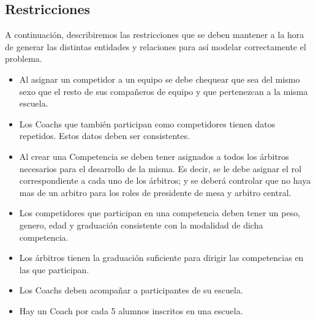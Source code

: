 \subsection{Restricciones}


A continuación, describiremos las restricciones que se deben mantener a la hora de generar las distintas entidades y relaciones para así modelar correctamente el problema.

\begin{itemize}
\item Al asignar un competidor a un equipo se debe chequear que sea del mismo sexo que el resto de sus compañeros de equipo y que pertenezcan a la misma escuela.
\item Los Coachs que también participan como competidores tienen datos repetidos. Estos datos deben ser consistentes.
\item Al crear una Competencia se deben tener asignados a todos los árbitros necesarios para el desarrollo de la misma. Es decir, se le debe asignar el rol correspondiente a cada uno de los árbitros; y se deberá controlar que no haya mas de un arbitro para los roles de presidente de mesa y arbitro central.
\item Los competidores que participan en una competencia deben tener un peso, genero, edad y graduación consistente con la modalidad de dicha competencia.
\item Los árbitros tienen la graduación suficiente para dirigir las competencias en las que participan.
\item Los Coachs deben acompañar a participantes de su escuela.
\item Hay un Coach por cada 5 alumnos inscritos en una escuela.
\end{itemize}